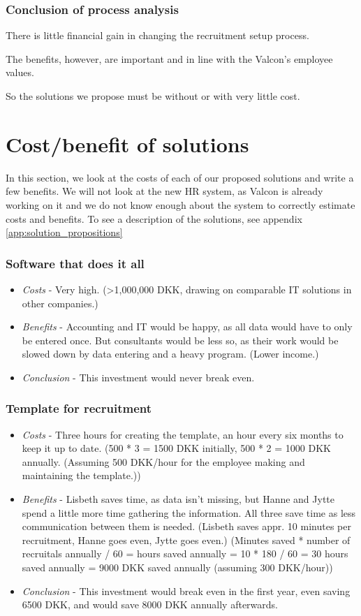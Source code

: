 \subsubsection{Conclusion of process analysis}
There is little financial gain in changing the recruitment setup process.

The benefits, however, are important and in line with the Valcon's employee values.

So the solutions we propose must be without or with very little cost.

\section{Cost/benefit of solutions}
In this section, we look at the costs of each of our proposed solutions and write a few benefits.
We will not look at the new HR system, as Valcon is already working on it and we do not know enough about the system to correctly estimate costs and benefits. 
To see a description of the solutions, see appendix \ref{app:solution_propositions}

\subsubsection{Software that does it all}
\begin{itemize}
\item \emph{Costs} - Very high. (\textgreater 1,000,000 DKK, drawing on comparable IT solutions in other companies.)
\item \emph{Benefits} - Accounting and IT would be happy, as all data would have to only be entered once. But consultants would be less so, as their work would be slowed down by data entering and a heavy program. (Lower income.)
\item \emph{Conclusion} - This investment would never break even.
\end{itemize}

\subsubsection{Template for recruitment}
\begin{itemize}
\item \emph{Costs} - Three hours for creating the template, an hour every six months to keep it up to date. (500 * 3 = 1500 DKK initially, 500 * 2 = 1000 DKK annually. (Assuming 500 DKK/hour for the employee making and maintaining the template.))
\item \emph{Benefits} - Lisbeth saves time, as data isn't missing, but Hanne and Jytte spend a little more time gathering the information. All three save time as less communication between them is needed. (Lisbeth saves appr. 10 minutes per recruitment, Hanne goes even, Jytte goes even.) (Minutes saved * number of recruitals annually / 60 = hours saved annually = 10 * 180 / 60 = 30 hours saved annually = 9000 DKK saved annually (assuming 300 DKK/hour))
\item \emph{Conclusion} - This investment would break even in the first year, even saving 6500 DKK, and would save 8000 DKK annually afterwards.
\end{itemize}

